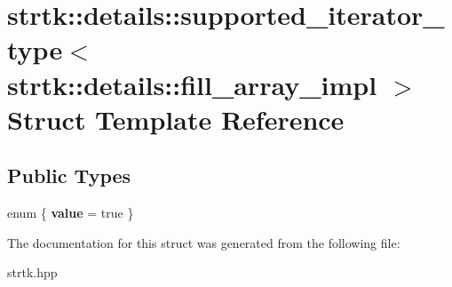 \hypertarget{structstrtk_1_1details_1_1supported__iterator__type_3_01strtk_1_1details_1_1fill__array__impl_01_4}{\section{strtk\-:\-:details\-:\-:supported\-\_\-iterator\-\_\-type$<$ strtk\-:\-:details\-:\-:fill\-\_\-array\-\_\-impl $>$ Struct Template Reference}
\label{structstrtk_1_1details_1_1supported__iterator__type_3_01strtk_1_1details_1_1fill__array__impl_01_4}
}
\subsection*{Public Types}
\begin{DoxyCompactItemize}
\item 
enum \{ {\bfseries value} = true
 \}
\end{DoxyCompactItemize}


The documentation for this struct was generated from the following file\-:\begin{DoxyCompactItemize}
\item 
strtk.\-hpp\end{DoxyCompactItemize}
